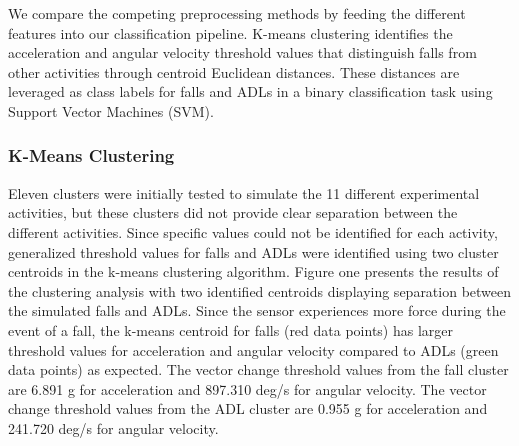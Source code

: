 \documentclass{llncs}
\begin{document}
	

We compare the competing preprocessing methods by feeding the different features into our classification pipeline. K-means clustering identifies the acceleration and angular velocity threshold values that distinguish falls from other activities through centroid Euclidean distances. These distances are leveraged as class labels for falls and ADLs in a binary classification task using Support Vector Machines (SVM). 

\subsubsection{K-Means Clustering} 
Eleven clusters were initially tested to simulate the 11 different experimental activities, but these clusters did not provide clear separation between the different activities. Since specific values could not be identified for each activity, generalized threshold values for falls and ADLs were identified using two cluster centroids in the k-means clustering algorithm. Figure one presents the results of the clustering analysis with two identified centroids displaying separation between the simulated falls and ADLs. Since the sensor experiences more force during the event of a fall, the k-means centroid for falls (red data points) has larger threshold values for acceleration and angular velocity compared to ADLs (green data points) as expected. The vector change threshold values from the fall cluster are 6.891 g for acceleration and 897.310 deg/s for angular velocity. The vector change threshold values from the ADL cluster are 0.955 g for acceleration and 241.720 deg/s for angular velocity. 
\end{document}
